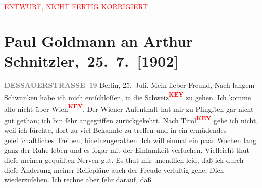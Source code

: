 
\begin{center}
            \textcolor{red}{ENTWURF, NICHT FERTIG KORRIGIERT}
                      \end{center}
            
         
         \renewcommand{\erwaehntePersonen}{Personen: Otto Brahm, Olga Schnitzler}
         \renewcommand{\erwaehnteOrte}{Orte: Berlin, Dessauer Straße, Wien}
         \renewcommand{\erwaehnteWerke}{Werke: Der Schleier der Beatrice. Schauspiel in fünf Akten}
               \section[ Paul Goldmann an Arthur Schnitzler, 25. 7. {[}1902{]}]{ Paul Goldmann an Arthur Schnitzler, 25. 7. {[}1902{]}}\nopagebreak{}\rehead{ }\begin{ledgroupsized}[t]{13cm}\normalsize\beginnumbering \toendnotes[C]{\smallbreak\pagebreak[2]} 
\pstart
           \noindent{}\raggedleft{}{\pb}\textcolor{gray}{\textbf{DESSAUERSTRASSE 19}}\pend
           \pstart
           Berlin, 25. Juli.\pend
           \pstart\center{}Mein lieber Freund,\pend\pstart
           Nach langem Schwanken habe ich mich entſchloſſen, in die Schweiz\textcolor{red}{\textsuperscript{\textbf{KEY}}} zu gehen. Ich komme alſo nicht über Wien\textcolor{red}{\textsuperscript{\textbf{KEY}}}. Der Wiener Aufenthalt hat mir
                    zu Pfingſten gar nicht gut gethan; ich  bin ſehr angegriffen zurückgekehrt. Nach Tirol\textcolor{red}{\textsuperscript{\textbf{KEY}}} gehe ich nicht, weil ich fürchte, dort zu viel Bekannte zu
                    treffen und in ein ermüdendes geſellſchaftliches {\pb}Treiben, hineinzugerathen. Ich will einmal ein
                    paar Wochen lang ganz der Ruhe leben und es ſogar mit der Einſamkeit verſuchen.
                    Vielleicht thut dieſe meinen gequälten Nerven gut. \pend
           \pstart
           Es thut mir unendlich leid, daß ich durch dieſe Änderung meiner Reiſepläne auch
                    der Freude verluſtig gehe, Dich wiederzuſehen. Ich rechne aber ſehr darauf, daß

\end{ledgroupsized}
